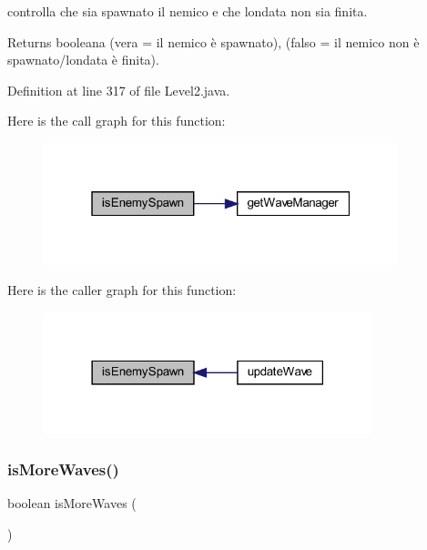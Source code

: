 controlla che sia spawnato il nemico e che l\textquotesingle{}ondata non sia finita. 

\begin{DoxyReturn}{Returns}
booleana (vera = il nemico è spawnato), (falso = il nemico non è spawnato/l\textquotesingle{}ondata è finita). 
\end{DoxyReturn}


Definition at line 317 of file Level2.\+java.

Here is the call graph for this function\+:\nopagebreak
\begin{figure}[H]
\begin{center}
\leavevmode
\includegraphics[width=292pt]{classscenes_1_1_level2_a121827ebd1c5b24c92f966721b51c0b9_cgraph}
\end{center}
\end{figure}
Here is the caller graph for this function\+:\nopagebreak
\begin{figure}[H]
\begin{center}
\leavevmode
\includegraphics[width=270pt]{classscenes_1_1_level2_a121827ebd1c5b24c92f966721b51c0b9_icgraph}
\end{center}
\end{figure}
\mbox{\label{classscenes_1_1_level2_a999f12a033f49f299ad7f55bcae24447}} 
\subsubsection{\texorpdfstring{is\+More\+Waves()}{isMoreWaves()}}
{\footnotesize\ttfamily boolean is\+More\+Waves (\begin{DoxyParamCaption}{ }\end{DoxyParamCaption})\hspace{0.3cm}{\ttfamily [private]}}



